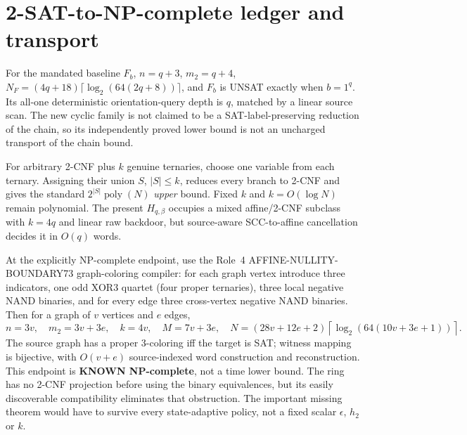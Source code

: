 \documentclass[11pt]{article}
\begin{document}
\section{2-SAT-to-NP-complete ledger and transport}
For the mandated baseline $F_b$, $n=q+3$, $m_2=q+4$,
$N_F=(4q+18)\lceil\log_2(64(2q+8))\rceil$,
and $F_b$ is UNSAT exactly when $b=1^q$.
Its all-one deterministic orientation-query depth is $q$,
matched by a linear source scan. The new cyclic family
is not claimed to be a SAT-label-preserving reduction of
the chain, so its independently proved lower bound is not
an uncharged transport of the chain bound.

For arbitrary 2-CNF plus $k$ genuine ternaries, choose one variable
from each ternary. Assigning their union $S$, $|S|\le k$,
reduces every branch to 2-CNF and gives the standard
$2^{|S|}\operatorname{poly}(N)$ \emph{upper} bound.
Fixed $k$ and $k=O(\log N)$ remain polynomial.
The present $H_{q,\beta}$ occupies a mixed affine/2-CNF
subclass with $k=4q$ and linear raw backdoor, but source-aware
SCC-to-affine cancellation decides it in $O(q)$ words.

At the explicitly NP-complete endpoint, use the Role~4
AFFINE-NULLITY-BOUNDARY73 graph-coloring compiler:
for each graph vertex introduce three indicators, one
odd XOR3 quartet (four proper ternaries), three local
negative NAND binaries, and for every edge three
cross-vertex negative NAND binaries. Then for a graph
of $v$ vertices and $e$ edges,
\[
n=3v,\quad m_2=3v+3e,\quad k=4v,\quad
M=7v+3e,\quad N=(28v+12e+2)
\left\lceil\log_2(64(10v+3e+1))\right\rceil.
\tag{10}
\]
The source graph has a proper 3-coloring iff the target
is SAT; witness mapping is bijective, with $O(v+e)$
source-indexed word construction and reconstruction.
This endpoint is \textbf{KNOWN NP-complete}, not a time
lower bound. The ring has no 2-CNF projection before
using the binary equivalences, but its easily discoverable
compatibility eliminates that obstruction. The important
missing theorem would have to survive every state-adaptive
policy, not a fixed scalar $\epsilon$, $h_2$ or $k$.
\end{document}
